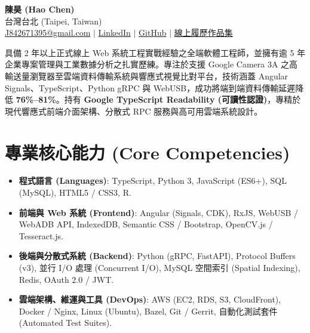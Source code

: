 \documentclass[10pt,a4paper]{article}
\begin{document}
\pagestyle{empty}

\begin{center}
    {\fontsize{22pt}{25pt}\bfseries\color{maindark} 陳昊 (Hao Chen)}\\[3pt]
    {\footnotesize\color{subgray} 台灣台北 (Taipei, Taiwan)}\\[2pt]
    {\footnotesize\color{subgray} \href{mailto:J842671395@gmail.com}{J842671395@gmail.com} \hspace{0.5em}$|$\hspace{0.5em} \href{https://www.linkedin.com/in/hao-chen-804a8315a/}{LinkedIn} \hspace{0.5em}$|$\hspace{0.5em} \href{https://github.com/Haohaoscreamandrun}{GitHub} \hspace{0.5em}$|$\hspace{0.5em} \href{https://haohaoscreamandrun.github.io/backend-dev-resume/}{線上履歷作品集}}
\end{center}

\vspace{2pt}

\noindent\small{\color{maindark} 具備 2 年以上正式線上 Web 系統工程實戰經驗之全端軟體工程師，並擁有逾 5 年企業專案管理與工業數據分析之扎實歷練。專注於支援 Google Camera 3A 之高輸送量瀏覽器至雲端資料傳輸系統與響應式視覺比對平台，技術涵蓋 Angular Signals、TypeScript、Python gRPC 與 WebUSB，成功將端到端資料傳輸延遲降低 \textbf{76\%--81\%}。持有 \textbf{Google TypeScript Readability (可讀性認證)}，專精於現代響應式前端介面架構、分散式 RPC 服務與高可用雲端系統設計。}

\section{專業核心能力 (Core Competencies)}
\begin{itemize}
    \item \textbf{程式語言 (Languages)}: TypeScript, Python 3, JavaScript (ES6+), SQL (MySQL), HTML5 / CSS3, R.
    \item \textbf{前端與 Web 系統 (Frontend)}: Angular (Signals, CDK), RxJS, WebUSB / WebADB API, IndexedDB, Semantic CSS / Bootstrap, OpenCV.js / Tesseract.js.
    \item \textbf{後端與分散式系統 (Backend)}: Python (gRPC, FastAPI), Protocol Buffers (v3), 並行 I/O 處理 (Concurrent I/O), MySQL 空間索引 (Spatial Indexing), Redis, OAuth 2.0 / JWT.
    \item \textbf{雲端架構、維運與工具 (DevOps)}: AWS (EC2, RDS, S3, CloudFront), Docker / Nginx, Linux (Ubuntu), Bazel, Git / Gerrit, 自動化測試套件 (Automated Test Suites).
\end{itemize}
\end{document}
